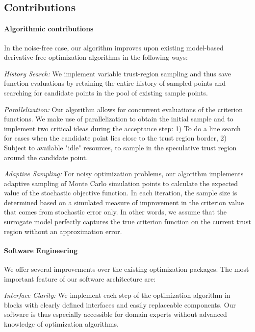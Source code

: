 \subsection{Contributions}
\label{subsec:intro-contributions}
\paragraph{Algorithmic contributions} In the noise-free case, our algorithm improves upon existing model-based derivative-free optimization algorithms in the following ways:


\textit{History Search:} We implement variable trust-region sampling and thus save function evaluations by retaining the entire history of sampled points and searching for candidate points in the pool of existing sample points.



\textit{Parallelization:} Our algorithm allows for concurrent evaluations of the criterion functions. We make use of parallelization to obtain the initial sample and to implement two critical ideas during the acceptance step: 1) To do a line search for cases when the candidate point lies close to the trust region border, 2) Subject to available "idle" resources, to sample in the speculative trust region around the candidate point.


\textit{Adaptive Sampling:} For noisy optimization problems, our algorithm implements adaptive sampling of Monte Carlo simulation points to calculate the expected value of the stochastic objective function. In each iteration, the sample size is determined based on a simulated measure of improvement in the criterion value that comes from stochastic error only. In other words, we assume that the surrogate model perfectly captures the true criterion function on the current trust region without an approximation error.


\paragraph{Software Engineering} We offer several improvements over the existing optimization packages. The most important feature of our software architecture are:


\textit{Interface Clarity:} We implement each step of the optimization algorithm in blocks with clearly defined interfaces and easily replaceable components. Our software is thus especially accessible for domain experts without advanced knowledge of optimization algorithms.

